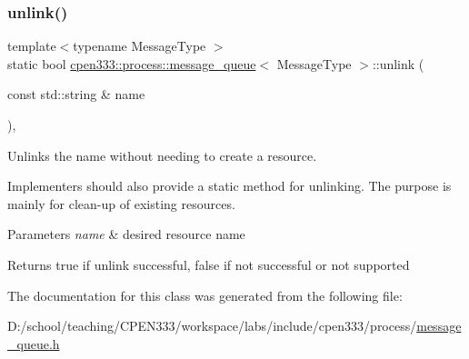 \mbox{\label{classcpen333_1_1process_1_1message__queue_aca172436d5b30c250c301d3c224598b6}} 
\subsubsection{\texorpdfstring{unlink()}{unlink()}\hspace{0.1cm}{\footnotesize\ttfamily [2/2]}}
{\footnotesize\ttfamily template$<$typename Message\+Type $>$ \\
static bool \hyperlink{classcpen333_1_1process_1_1message__queue}{cpen333\+::process\+::message\+\_\+queue}$<$ Message\+Type $>$\+::unlink (\begin{DoxyParamCaption}\item[{const std\+::string \&}]{name }\end{DoxyParamCaption})\hspace{0.3cm}{\ttfamily [inline]}, {\ttfamily [static]}}



Unlinks the name without needing to create a resource. 

Implementers should also provide a static method for unlinking. The purpose is mainly for clean-\/up of existing resources.


\begin{DoxyParams}{Parameters}
{\em name} & desired resource name \\
\hline
\end{DoxyParams}
\begin{DoxyReturn}{Returns}
{\ttfamily true} if unlink successful, {\ttfamily false} if not successful or not supported 
\end{DoxyReturn}


The documentation for this class was generated from the following file\+:\begin{DoxyCompactItemize}
\item 
D\+:/school/teaching/\+C\+P\+E\+N333/workspace/labs/include/cpen333/process/\hyperlink{message__queue_8h}{message\+\_\+queue.\+h}\end{DoxyCompactItemize}
